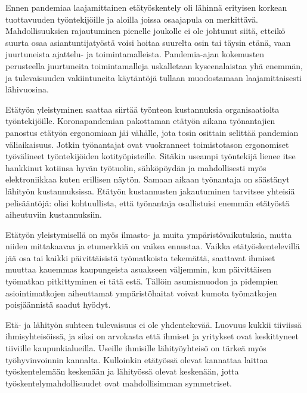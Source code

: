 \documentclass[nobib,finnish,oneside,openany,notoc,a4paper]{tufte-book}
\begin{document}
Ennen pandemiaa laajamittainen etätyöskentely oli lähinnä erityisen
korkean tuottavuuden työntekijöille ja aloilla joissa osaajapula on
merkittävä. Mahdollisuuksien rajautuminen pienelle joukolle ei ole
johtunut siitä, etteikö suurta osaa asiantuntijatyöstä voisi hoitaa
suurelta osin tai täysin etänä, vaan juurtuneista ajattelu- ja
toimintamalleista. Pandemia-ajan kokemusten perusteella juurtuneita
toimintamalleja uskalletaan kyseenalaistaa yhä enemmän, ja tulevaisuuden
vakiintuneita käytäntöjä tullaan muodostamaan laajamittaisesti
lähivuosina.

Etätyön yleistyminen saattaa siirtää työnteon kustannuksia
organisaatiolta työntekijöille. Koronapandemian pakottaman etätyön
aikana työnantajien panostus etätyön ergonomiaan jäi vähälle, jota tosin
osittain selittää pandemian väliaikaisuus. Jotkin työnantajat ovat
vuokranneet toimistotason ergonomiset työvälineet työntekijöiden
kotityöpisteille. Sitäkin useampi työntekijä lienee itse hankkinut
kotiinsa hyvän työtuolin, sähköpöydän ja mahdollisesti myös
elektroniikkaa kuten erillisen näytön. Samaan aikaan työnantaja on
säästänyt lähityön kustannuksissa. Etätyön kustannusten jakautuminen
tarvitsee yhteisiä pelisääntöjä: olisi kohtuullista, että työnantaja
osallistuisi enemmän etätyöstä aiheutuviin kustannuksiin.

Etätyön yleistymisellä on myös ilmasto- ja muita ympäristövaikutuksia,
mutta niiden mittakaavaa ja etumerkkiä on vaikea ennustaa. Vaikka
etätyöskentelevillä jää osa tai kaikki päivittäisistä työmatkoista
tekemättä, saattavat ihmiset muuttaa kauemmas kaupungeista asuakseen
väljemmin, kun päivittäisen työmatkan pitkittyminen ei tätä estä.
Tällöin asumismuodon ja pidempien asiointimatkojen aiheuttamat
ympäristöhaitat voivat kumota työmatkojen poisjäännistä saadut hyödyt.

Etä- ja lähityön suhteen tulevaisuus ei ole yhdentekevää. Luovuus kukkii
tiiviissä ihmisyhteisöissä, ja siksi on arvokasta että ihmiset ja
yritykset ovat keskittyneet tiiviille kaupunkialueilla. Useille
ihmisille lähityöyhteisö on tärkeä myös työhyvinvoinnin kannalta.  Kulloinkin etätyössä olevat kannattaa
laittaa työskentelemään keskenään ja lähityössä olevat keskenään, jotta
työskentelymahdollisuudet ovat mahdollisimman symmetriset.
\end{document}
